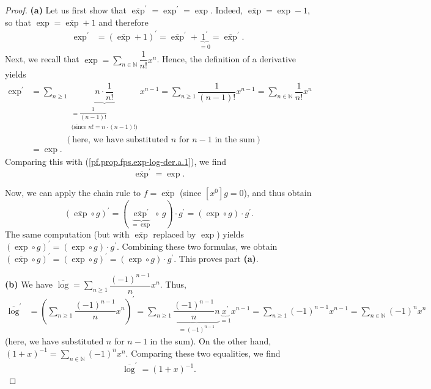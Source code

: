 \begin{proof}
\textbf{(a)} Let us first
show that $\overline{\exp}^{\prime}=\exp^{\prime}=\exp$. Indeed,
$\overline{\exp}=\exp-1$, so that $\exp=\overline{\exp}+1$ and therefore
\begin{align}
\exp^{\prime} &  =\left(\overline{\exp}+1\right)^{\prime}=\overline{\exp
}^{\prime}+\underbrace{1^{\prime}}_{=0}
=\overline{\exp}^{\prime}. \label{pf.prop.fps.exp-log-der.a.1}
\end{align}
Next, we recall that $\exp=\sum_{n\in\mathbb{N}}\dfrac{1}{n!}x^{n}$. Hence,
the definition of a derivative yields
\begin{align}
\exp^{\prime} &  =\sum_{n\geq1}\underbrace{n\cdot\dfrac{1}{n!}}%
_{\substack{=\dfrac{1}{\left(n-1\right)!}\\\text{(since }n!=n\cdot\left(
n-1\right)!\text{)}}}x^{n-1}=\sum_{n\geq1}\dfrac{1}{\left(n-1\right)
!}x^{n-1}=\sum_{n\in\mathbb{N}}\dfrac{1}{n!}x^{n}\nonumber\\
& \qquad\qquad\left(\text{here, we have
substituted }n\text{ for }n-1\text{ in the sum}\right) \nonumber\\
&  =\exp. \label{pf.prop.fps.exp-log-der.a.2}
\end{align}
Comparing this with (\ref{pf.prop.fps.exp-log-der.a.1}), we find
\begin{equation}
\overline{\exp}^{\prime}=\exp. \label{pf.prop.fps.exp-log-der.a.3}
\end{equation}

Now, we can apply the chain rule to $f=\overline{\exp}$
(since $\left[x^{0}\right]g=0$), and
thus obtain
\[
\left(\overline{\exp}\circ g\right)^{\prime}=\left(\underbrace{\overline
{\exp}^{\prime}}_{=\exp}\circ\,g\right)\cdot g^{\prime}=\left(\exp\circ
g\right)\cdot g^{\prime}.
\]
The same computation (but with $\overline{\exp}$ replaced by $\exp$) yields
$\left(\exp\circ g\right)^{\prime}=\left(\exp\circ g\right)\cdot
g^{\prime}$. Combining these two formulas, we obtain $\left(\overline{\exp
}\circ g\right)^{\prime}=\left(\exp\circ g\right)^{\prime}=\left(
\exp\circ g\right)\cdot g^{\prime}$. This proves part \textbf{(a)}.

\textbf{(b)} We have $\overline{\log}=\sum_{n\geq1}\dfrac{\left(-1\right)
^{n-1}}{n}x^{n}$. Thus,
\begin{align*}
\overline{\log}^{\prime} &  =\left(\sum_{n\geq1}\dfrac{\left(-1\right)
^{n-1}}{n}x^{n}\right)^{\prime}
=\sum_{n\geq1}\underbrace{\dfrac{\left(-1\right)^{n-1}}{n}n}_{=\left(
-1\right)^{n-1}}\underbrace{x^{\prime}}_{=1}x^{n-1}=\sum_{n\geq1}\left(
-1\right)^{n-1}x^{n-1}=\sum_{n\in\mathbb{N}}\left(-1\right)^{n}x^{n}
\end{align*}
(here, we have substituted $n$ for $n-1$ in the sum). On the other hand,
$\left(1+x\right)^{-1}
=\sum_{n\in\mathbb{N}}\left(-1\right)^{n}x^{n}$. Comparing these two
equalities, we find
\begin{equation}
\overline{\log}^{\prime}=\left(1+x\right)^{-1}.
\label{pf.prop.fps.exp-log-der.b.2}
\end{equation}


\end{proof}

